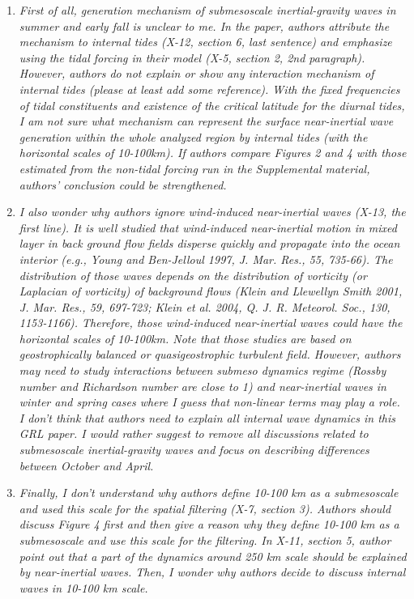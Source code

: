 \documentclass[11pt]{article}
\begin{document}
\begin{enumerate}

  \item {\it First of all, generation mechanism of submesoscale inertial-gravity waves in summer
        and early fall is unclear to me. In the paper, authors attribute the mechanism to
        internal tides (X-12, section 6, last sentence) and emphasize using the tidal forcing in
        their model (X-5, section 2, 2nd paragraph). However, authors do not explain or show
        any interaction mechanism of internal tides (please at least add some reference). With
        the fixed frequencies of tidal constituents and existence of the critical latitude for the
        diurnal tides, I am not sure what mechanism can represent the surface near-inertial
        wave generation within the whole analyzed region by internal tides (with the
        horizontal scales of 10-100km). If authors compare Figures 2 and 4 with those
        estimated from the non-tidal forcing run in the Supplemental material, authors'
        conclusion could be strengthened.}

  \item {\it I also wonder why authors ignore wind-induced near-inertial waves (X-13, the first
        line). It is well studied that wind-induced near-inertial motion in mixed layer in back
        ground flow fields disperse quickly and propagate into the ocean interior (e.g., Young
        and Ben-Jelloul 1997, J. Mar. Res., 55, 735-66). The distribution of those waves
        depends on the distribution of vorticity (or Laplacian of vorticity) of background
        flows (Klein and Llewellyn Smith 2001, J. Mar. Res., 59, 697-723; Klein et al. 2004, Q.
        J. R. Meteorol. Soc., 130, 1153-1166). Therefore, those wind-induced near-inertial
        waves could have the horizontal scales of 10-100km. Note that those studies are based
        on geostrophically balanced or quasigeostrophic turbulent field. However, authors
        may need to study interactions between submeso dynamics regime (Rossby number
        and Richardson number are close to 1) and near-inertial waves in winter and spring
        cases where I guess that non-linear terms may play a role. I don't think that authors
        need to explain all internal wave dynamics in this GRL paper. I would rather suggest
        to remove all discussions related to submesoscale inertial-gravity waves and focus on
        describing differences between October and April.}

  \item {\it Finally, I don't understand why authors define 10-100 km as a submesoscale and used
        this scale for the spatial filtering (X-7, section 3). Authors should discuss Figure 4 first
        and then give a reason why they define 10-100 km as a submesoscale and use this
        scale for the filtering. In X-11, section 5, author point out that a part of the dynamics
        around 250 km scale should be explained by near-inertial waves. Then, I wonder why
        authors decide to discuss internal waves in 10-100 km scale.}
\end{enumerate}
\end{document}
